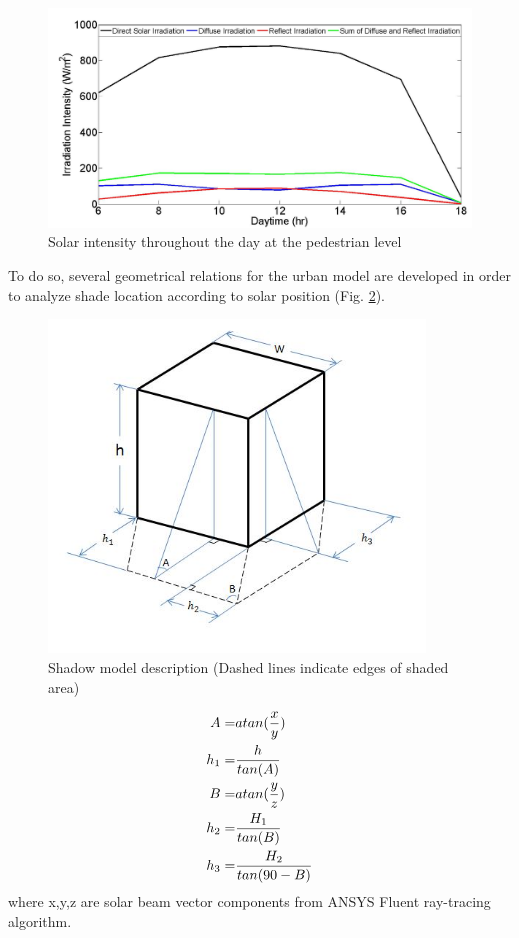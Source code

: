 \documentclass[preprint,3p,12pt,english]{elsarticle}
\begin{document}
\begin{figure}[H]
\graphicspath{ {image/} }
\centerline{\includegraphics[width=14cm]{SolarIntensity.jpg}}
\caption{Solar intensity throughout the day at the pedestrian level}
\label{Fig.SolarIntensity}
\end{figure}

To do so, several geometrical relations for the urban model are developed in order to analyze shade location according to solar position (Fig. \ref{Fig.Shadow}). 
\begin{figure}[H]
\graphicspath{ {image/} }
\centerline{\includegraphics[width=10cm]{SVFModel.JPG}}
\caption{Shadow model description (Dashed lines indicate edges of shaded area)}
\label{Fig.Shadow}
\end{figure}


\begin{equation}
\centering
\begin{split}
A=&atan(\frac{x}{y})\\
h_1=&\frac{h}{tan(A)}\\
B=&atan(\frac{y}{z})\\
h_2=&\frac{H_1}{tan(B)}\\
h_3=&\frac{H_2}{tan(90-B)}\\
\end{split}
\end{equation}
where x,y,z are solar beam vector components from ANSYS Fluent ray-tracing algorithm.
\end{document}

